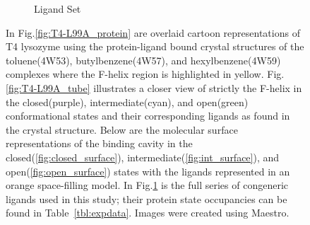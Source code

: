 \documentclass[journal=jctcce,manuscript=article]{achemso}
\begin{document}
\begin{figure}[!ht]
\begin{subfigure}{0.75\textwidth}
   \caption{Ligand Set}
   \label{fig:ligand_set}
\end{subfigure}\hfill
\caption{In Fig.\ref{fig:T4-L99A_protein} are overlaid cartoon representations of T4 lysozyme using the protein-ligand bound crystal structures of the toluene(4W53), butylbenzene(4W57), and hexylbenzene(4W59) complexes where the F-helix region is highlighted in yellow.
Fig.\ref{fig:T4-L99A_tube} illustrates a closer view of strictly the F-helix in the closed(purple), intermediate(cyan), and open(green) conformational states and their corresponding ligands as found in the crystal structure.
Below are the molecular surface representations of the binding cavity in the closed(\ref{fig:closed_surface}), intermediate(\ref{fig:int_surface}), and open(\ref{fig:open_surface}) states with the ligands represented in an orange space-filling model.
In Fig.\ref{fig:ligand_set} is the full series of congeneric ligands used in this study; their protein state occupancies can be found in Table~\ref{tbl:expdata}.
Images were created using Maestro\cite{Maestro}.}
\label{fig:T4-L99A}
\end{figure}
\end{document}
